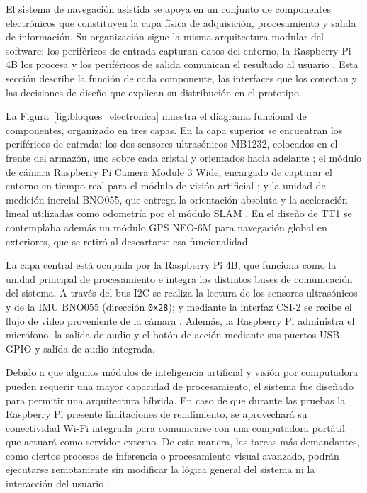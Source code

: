 El sistema de navegación asistida se apoya en un conjunto de componentes electrónicos
que constituyen la capa física de adquisición, procesamiento y salida de información.
Su organización sigue la misma arquitectura modular del software: los periféricos de
entrada capturan datos del entorno, la Raspberry Pi 4B los procesa y los periféricos
de salida comunican el resultado al usuario \cite{raspberrypi4_datasheet}. Esta sección
describe la función de cada componente, las interfaces que los conectan y las
decisiones de diseño que explican su distribución en el prototipo.
 
La Figura~\ref{fig:bloques_electronica} muestra el diagrama funcional de componentes,
organizado en tres capas. En la capa superior se encuentran los periféricos de
entrada: los dos sensores ultrasónicos MB1232, colocados en el frente del armazón,
uno sobre cada cristal y orientados hacia adelante \cite{mb1232_datasheet};
el módulo de cámara Raspberry Pi Camera Module 3 Wide, encargado de capturar el
entorno en tiempo real para el módulo de visión artificial
\cite{raspberrypi_camera_doc3}; y la unidad de medición inercial BNO055, que entrega
la orientación absoluta y la aceleración lineal utilizadas como odometría por el
módulo SLAM \cite{bno055_datasheet}. En el diseño de TT1 se contemplaba además un
módulo GPS NEO-6M para navegación global en exteriores, que se retiró al descartarse
esa funcionalidad.
 
La capa central está ocupada por la Raspberry Pi 4B, que funciona como la unidad
principal de procesamiento e integra los distintos buses de comunicación del sistema.
A través del bus I2C se realiza la lectura de los sensores ultrasónicos y de la IMU
BNO055 (dirección \texttt{0x28}); y mediante la interfaz CSI-2 se recibe el flujo de
video proveniente de la cámara \cite{raspberrypi4_datasheet}. Además, la Raspberry
Pi administra el micrófono, la salida de audio y el botón de acción mediante sus
puertos USB, GPIO y salida de audio integrada.

Debido a que algunos módulos de inteligencia artificial y visión por computadora
pueden requerir una mayor capacidad de procesamiento, el sistema fue diseñado para
permitir una arquitectura híbrida. En caso de que durante las pruebas la Raspberry Pi
presente limitaciones de rendimiento, se aprovechará su conectividad Wi-Fi integrada
para comunicarse con una computadora portátil que actuará como servidor externo. De
esta manera, las tareas más demandantes, como ciertos procesos de inferencia o
procesamiento visual avanzado, podrán ejecutarse remotamente sin modificar la lógica
general del sistema ni la interacción del usuario \cite{raspberrypi4_datasheet}.

